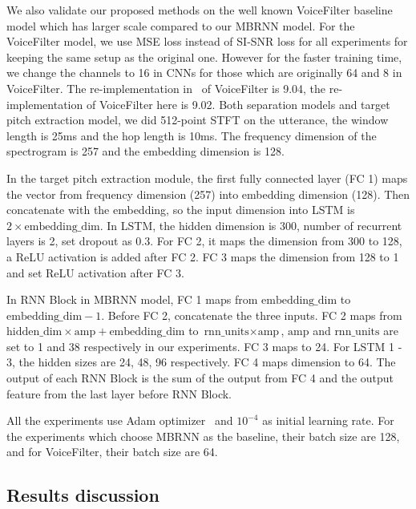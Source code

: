 We also validate our proposed methods on the well known VoiceFilter baseline model which has larger scale compared to our MBRNN model. For the VoiceFilter model, we use MSE loss instead of SI-SNR loss for all experiments for keeping the same setup as the original one. However for the faster training time, we change the channels to 16 in CNNs for those which are originally 64 and 8 in VoiceFilter. The re-implementation in~\cite{li20p_interspeech} of VoiceFilter is 9.04, the re-implementation of VoiceFilter here is 9.02.
Both separation models and target pitch extraction model, we did 512-point STFT on the utterance, the window length is 25ms and the hop length is 10ms. The frequency dimension of the spectrogram is 257 and the embedding dimension is 128.

In the target pitch extraction module, the first fully connected layer (FC 1) maps the vector from frequency dimension (257) into embedding dimension (128). Then concatenate with the embedding, so the input dimension into LSTM is $2\times \text{embedding\_dim}$. In LSTM, the hidden dimension is 300, number of recurrent layers is 2, set dropout as 0.3. For FC 2, it maps the dimension from 300 to 128, a ReLU activation is added after FC 2. FC 3 maps the dimension from 128 to 1 and set ReLU activation after FC 3.

In RNN Block in MBRNN model, FC 1 maps from $\text{embedding\_dim}$ to $\text{embedding\_dim} - 1$. Before FC 2, concatenate the three inputs. FC 2 maps from $\text{hidden\_dim}\times\text{amp} + \text{embedding\_dim}$ to $\text{rnn\_units}\times\text{amp}$, $\text{amp}$ and $\text{rnn\_units}$ are set to 1 and 38 respectively in our experiments. FC 3 maps to 24. For LSTM 1 - 3, the hidden sizes are 24, 48, 96 respectively. FC 4 maps dimension to 64. The output of each RNN Block is the sum of the output from FC 4 and the output feature from the last layer before RNN Block.

All the experiments use Adam optimizer~\cite{kingma2017adam} and $10^{-4}$ as initial learning rate.
For the experiments which choose MBRNN as the baseline, their batch size are 128, and for VoiceFilter, their batch size are 64.

\subsection{Results discussion}
\label{subsec:results_discussion}

